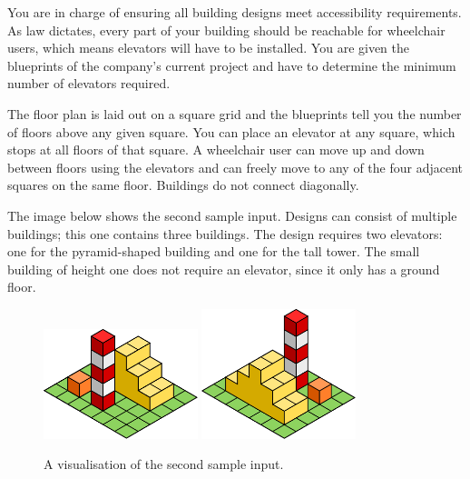 

\newcommand{\maxhw}{500}
\newcommand{\maxb}{10^9}

You are in charge of ensuring all building designs meet accessibility requirements.
As law dictates, every part of your building should be reachable for wheelchair users, which means elevators will have to be installed.
You are given the blueprints of the company's current project and have to determine the minimum number of elevators required.

The floor plan is laid out on a square grid and the blueprints tell you the number of floors above any given square.
You can place an elevator at any square, which stops at all floors of that
square.
A wheelchair user can move up and down between floors using the elevators and
can freely move to any of the four adjacent squares on the same
floor. Buildings do not connect diagonally.

The image below shows the second sample input. Designs can consist of
multiple buildings; this one contains three buildings. The design requires two
elevators: one for the pyramid-shaped building and one for the tall tower. The
small building of height one does not require an elevator, since it only has a
ground floor.

\begin{figure}[!h]
\centering
\includegraphics[width=0.4\textwidth]{drawing.pdf}
\includegraphics[width=0.4\textwidth]{drawing2.pdf}
\caption{A visualisation of the second sample input.}
\end{figure}


